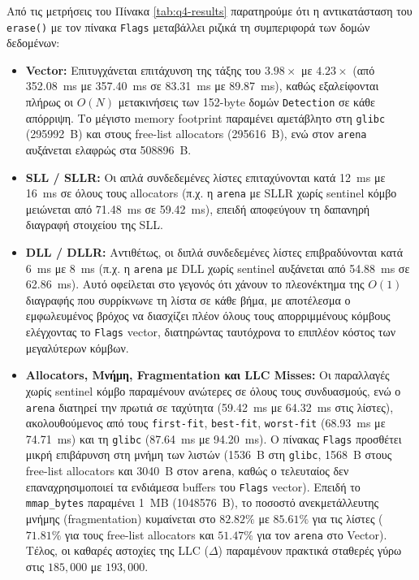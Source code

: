 \documentclass[12pt]{article}
\begin{document}
Από τις μετρήσεις του Πίνακα \ref{tab:q4-results} παρατηρούμε ότι η αντικατάσταση του \texttt{erase()} με τον πίνακα \texttt{Flags} μεταβάλλει ριζικά τη συμπεριφορά των δομών δεδομένων:
\begin{itemize}
\item \textbf{Vector:} Επιτυγχάνεται επιτάχυνση της τάξης του $3.98\times$ με $4.23\times$ (από \qty{352.08}{\milli\second} με \qty{357.40}{\milli\second} σε \qty{83.31}{\milli\second} με \qty{89.87}{\milli\second}), καθώς εξαλείφονται πλήρως οι $O(N)$ μετακινήσεις των 152-byte δομών \texttt{Detection} σε κάθε απόρριψη. Το μέγιστο memory footprint παραμένει αμετάβλητο στη \texttt{glibc} (\qty{295992}{B}) και στους free-list allocators (\qty{295616}{B}), ενώ στον \texttt{arena} αυξάνεται ελαφρώς στα \qty{508896}{B}.
\item \textbf{SLL / SLLR:} Οι απλά συνδεδεμένες λίστες επιταχύνονται κατά \qty{12}{\milli\second} με \qty{16}{\milli\second} σε όλους τους allocators (π.χ. η \texttt{arena} με SLLR χωρίς sentinel κόμβο μειώνεται από \qty{71.48}{\milli\second} σε \qty{59.42}{\milli\second}), επειδή αποφεύγουν τη δαπανηρή διαγραφή στοιχείου της SLL.
\item \textbf{DLL / DLLR:} Αντιθέτως, οι διπλά συνδεδεμένες λίστες επιβραδύνονται κατά \qty{6}{\milli\second} με \qty{8}{\milli\second} (π.χ. η \texttt{arena} με DLL χωρίς sentinel αυξάνεται από \qty{54.88}{\milli\second} σε \qty{62.86}{\milli\second}). Αυτό οφείλεται στο γεγονός ότι χάνουν το πλεονέκτημα της $O(1)$ διαγραφής που συρρίκνωνε τη λίστα σε κάθε βήμα, με αποτέλεσμα ο εμφωλευμένος βρόχος να διασχίζει πλέον όλους τους απορριμμένους κόμβους ελέγχοντας το \texttt{Flags} vector, διατηρώντας ταυτόχρονα το επιπλέον κόστος των μεγαλύτερων κόμβων.
\item \textbf{Allocators, Μνήμη, Fragmentation και LLC Misses:} Οι παραλλαγές χωρίς sentinel κόμβο παραμένουν ανώτερες σε όλους τους συνδυασμούς, ενώ ο \texttt{arena} διατηρεί την πρωτιά σε ταχύτητα (\qty{59.42}{\milli\second} με \qty{64.32}{\milli\second} στις λίστες), ακολουθούμενος από τους \texttt{first-fit}, \texttt{best-fit}, \texttt{worst-fit} (\qty{68.93}{\milli\second} με \qty{74.71}{\milli\second}) και τη \texttt{glibc} (\qty{87.64}{\milli\second} με \qty{94.20}{\milli\second}). Ο πίνακας \texttt{Flags} προσθέτει μικρή επιβάρυνση στη μνήμη των λιστών (\qty{1536}{B} στη \texttt{glibc}, \qty{1568}{B} στους free-list allocators και \qty{3040}{B} στον \texttt{arena}, καθώς ο τελευταίος δεν επαναχρησιμοποιεί τα ενδιάμεσα buffers του \texttt{Flags} vector). Επειδή το \texttt{mmap\_bytes} παραμένει \qty{1}{MB} (\qty{1048576}{B}), το ποσοστό ανεκμετάλλευτης μνήμης (fragmentation) κυμαίνεται στο $82.82\%$ με $85.61\%$ για τις λίστες ($71.81\%$ για τους free-list allocators και $51.47\%$ για τον \texttt{arena} στο Vector). Τέλος, οι καθαρές αστοχίες της LLC ($\Delta$) παραμένουν πρακτικά σταθερές γύρω στις $185{,}000$ με $193{,}000$.
\end{itemize}
\end{document}
